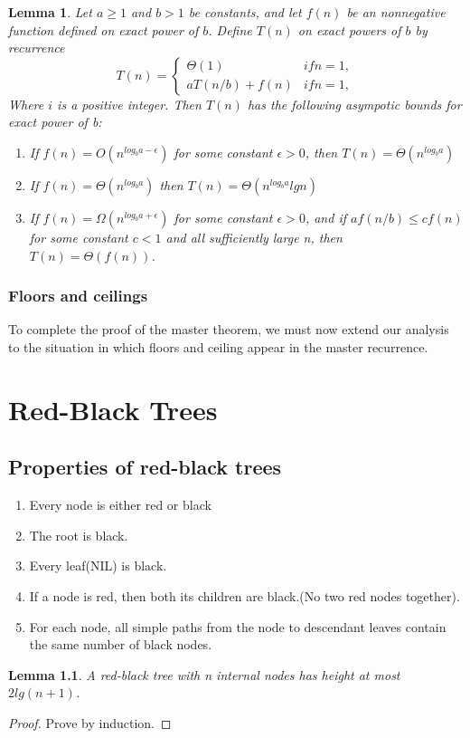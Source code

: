 \documentclass[a4paper,11pt]{book}
\newtheorem{lemma}[theorem]{Lemma}
\begin{document}
\begin{lemma}
Let $a\geq 1$ and $b>1$ be constants, and let $f(n)$ be an nonnegative function defined on exact power of $b$. Define $T(n)$ on exact powers of $b$ by recurrence
\[T(n) =\begin{cases}
\Theta(1) & if n=1,\\
aT(n/b)+f(n) & if n=1,
\end{cases}\]
Where $i$ is a positive integer. Then $T(n)$ has the following asympotic bounds for exact power of b:
\begin{enumerate}
\item If $f(n)=O(n^{log_b{a-\epsilon}})$ for some constant $\epsilon >0$, then $T(n) = \Theta (n^{log_ba})$
\item If $f(n)=\Theta(n^{log_ba})$ then $T(n)=\Theta(n^{log_ba} lgn)$
\item If $f(n)=\Omega(n^{log_ba+\epsilon})$ for some constant $\epsilon > 0$, and if $af(n/b) \leq cf(n)$ for some constant $c<1$ and all sufficiently large n, then $T(n)=\Theta(f(n))$. 
\end{enumerate}
\end{lemma}
\subsection{Floors and ceilings}
To complete the proof of the master theorem, we must now extend our analysis to the situation in which floors and ceiling appear in the master recurrence.
\chapter{Red-Black Trees}
\section{Properties of red-black trees}
\begin{enumerate}
\item Every node is either red or black
\item The root is black.
\item Every leaf(NIL) is black.
\item If a node is red, then both its children are black.(No two red nodes together).
\item For each node, all simple paths from the node to descendant leaves contain the same number of black nodes.
\end{enumerate}
\begin{lemma}
A red-black tree with n internal nodes has height at most $2lg(n+1)$.
\end{lemma}
\begin{proof}
Prove by induction.
\end{proof}
\end{document}
